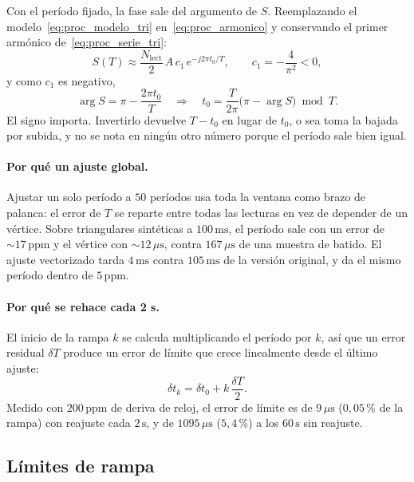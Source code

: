Con el período fijado, la fase sale del argumento de $S$. Reemplazando el
modelo~\eqref{eq:proc_modelo_tri} en~\eqref{eq:proc_armonico} y
conservando el primer armónico de~\eqref{eq:proc_serie_tri}:
\begin{equation}
  S(T) \approx \frac{N_\text{lect}}{2}\, A\, c_1\,
  e^{-j2\pi t_0/T},
  \qquad c_1 = -\frac{4}{\pi^2} < 0,
\end{equation}
y como $c_1$ es negativo,
\begin{equation}
  \arg S = \pi - \frac{2\pi t_0}{T}
  \quad\Longrightarrow\quad
  t_0 = \frac{T}{2\pi}\bigl(\pi - \arg S\bigr) \bmod T.
  \label{eq:proc_fase}
\end{equation}
El signo importa. Invertirlo devuelve $T - t_0$ en lugar de $t_0$, o sea
toma la bajada por subida, y no se nota en ningún otro número porque el
período sale bien igual.

\paragraph{Por qué un ajuste global.}
Ajustar un solo período a $50$ períodos usa toda la ventana como brazo de
palanca: el error de $T$ se reparte entre todas las lecturas en vez de
depender de un vértice. Sobre triangulares sintéticas a $100\,\text{ms}$, el
período sale con un error de $\sim 17\,\text{ppm}$ y el vértice con
$\sim 12\,\mu\text{s}$, contra $167\,\mu\text{s}$ de una muestra de batido.
El ajuste vectorizado tarda $4\,\text{ms}$ contra $105\,\text{ms}$ de la
versión original, y da el mismo período dentro de $5\,\text{ppm}$.

\paragraph{Por qué se rehace cada 2 s.}
El inicio de la rampa $k$ se calcula multiplicando el período por $k$, así
que un error residual $\delta T$ produce un error de límite que crece
linealmente desde el último ajuste:
\begin{equation}
  \delta t_k = \delta t_0 + k\,\frac{\delta T}{2}.
\end{equation}
Medido con $200\,\text{ppm}$ de deriva de reloj, el error de límite es de
$9\,\mu\text{s}$ ($0{,}05$\,\% de la rampa) con reajuste cada $2\,\text{s}$,
y de $1095\,\mu\text{s}$ ($5{,}4$\,\%) a los $60\,\text{s}$ sin reajuste.

\subsection{Límites de rampa}

